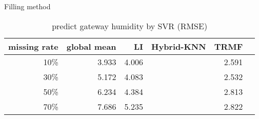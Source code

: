\begin{table} [htbp]
\centering
\caption{predict gateway humidity by SVR (RMSE) }
\label{table: SVR}
   Filling method
\begin{tabular}{ r | r r r r r}
        missing rate&global mean     &LI   &Hybrid-KNN &TRMF\\ \hline
        10\%    &3.933 &4.006&&2.591\\
        30\%    &5.172&4.083&&2.532\\
        50\%    &6.234&4.384&&2.813\\
        70\%   &7.686&5.235&&2.822\\
  
\end{tabular}
\end{table}
